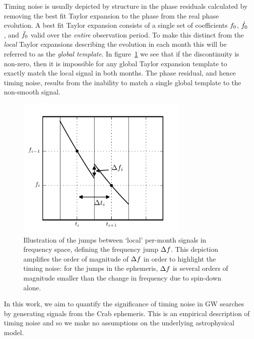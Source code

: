 \documentclass[../full_thesis/full_thesis.tex]{subfiles}
\begin{document}
Timing noise is usually depicted by structure in the phase residuals calculated
by removing the best fit Taylor expansion to the phase from the real phase
evolution. A best fit Taylor expansion consists of a single set of coefficients
$f_{0}$, $\dot{f}_{0}$, and $\ddot{f}_{0}$ valid over the \emph{entire}
observation period. To make this distinct from the \emph{local} Taylor
expansions describing the evolution in each month this will be referred to as
the \emph{global template}.  In figure~\ref{fig: template jumps} we see that if
the discontinuity is non-zero, then it is impossible for any global Taylor
expansion template to exactly match the local signal in both months. The
phase residual, and hence timing noise, results from the inability to match a
single global template to the non-smooth signal.

\begin{figure}[htb]
\centering
    \includegraphics[width=0.75\textwidth]{template_jumps}
\caption{Illustration of the jumps between `local' per-month signals in
    frequency space, defining the frequency jump $\Delta f$. This
        depiction amplifies the order of magnitude of $\Delta f$ in order to
        highlight the timing noise: for the jumps in the ephemeris, $\Delta f$
        is several orders of magnitude smaller than the change in frequency
        due to spin-down alone.}
\label{fig: template jumps}
\end{figure}

In this work, we aim to quantify the significance of timing
noise in GW searches by generating signals from the Crab ephemeris. This
is an empirical description of timing noise and so we
make no assumptions on the underlying astrophysical model.
\end{document}

